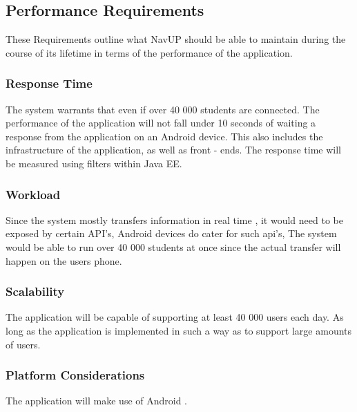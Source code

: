 \documentclass{article}
\begin{document}
	\subsection{Performance Requirements}
	These Requirements outline what NavUP should be able to maintain during the course of its lifetime in terms of the performance of the application.
		\subsubsection{Response Time}
		The system warrants that even if over 40 000 students are connected. The performance of the application will not fall under 10 seconds of waiting a response from the application on an Android device. This also includes the infrastructure of the application, as well as front - ends. The response time will be measured using filters within Java EE.
		\subsubsection{Workload}
		Since the system mostly transfers information in real time , it would need to be exposed by certain API's, Android devices do cater for such api's, The system would be able to run over 40 000 students at once since the actual transfer will happen on the users phone.
		\subsubsection{Scalability}
		The application will be capable of supporting at least  40 000 users each day. As long as the application is implemented in such a way as to support large amounts of users.
		\subsubsection{Platform Considerations}
		The application will make use of Android .
\end{document}
